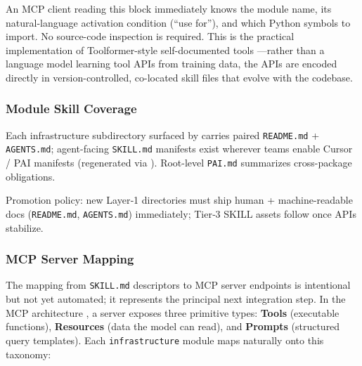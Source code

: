 \documentclass[
  english,
]{article}
\begin{document}
An MCP client reading this block immediately knows the module name, its
natural-language activation condition (``use for''), and which Python
symbols to import. No source-code inspection is required. This is the
practical implementation of Toolformer-style self-documented tools
\citep{schick2023toolformer}---rather than a language model learning
tool APIs from training data, the APIs are encoded directly in
version-controlled, co-located skill files that evolve with the
codebase.

\subsubsection{Module Skill Coverage}\label{module-skill-coverage}

Each infrastructure subdirectory surfaced by
 carries paired
\texttt{README.md} + \texttt{AGENTS.md}; agent-facing \texttt{SKILL.md}
manifests exist wherever teams enable Cursor / PAI manifests
(regenerated via ). Root-level
\texttt{PAI.md} summarizes cross-package obligations.

Promotion policy: new Layer‑1 directories must ship human +
machine-readable docs (\texttt{README.md}, \texttt{AGENTS.md})
immediately; Tier‑3 SKILL assets follow once APIs stabilize.

\subsubsection{MCP Server Mapping}\label{mcp-server-mapping}

The mapping from \texttt{SKILL.md} descriptors to MCP server endpoints
is intentional but not yet automated; it represents the principal next
integration step. In the MCP architecture \citep{anthropic2024mcp}, a
server exposes three primitive types: \textbf{Tools} (executable
functions), \textbf{Resources} (data the model can read), and
\textbf{Prompts} (structured query templates). Each
\texttt{infrastructure} module maps naturally onto this taxonomy:
\end{document}
